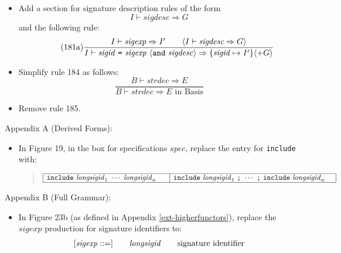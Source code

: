 \documentclass[twoside,titlepage]{article}
\begin{document}
\begin{appendix}
\begin{itemize}
\item Add a section for signature description rules of the form
  $$
  \boxed{I \vdash \mathit{sigdesc} \Rightarrow G}
  $$
  and the following rule:
  \begin{equation}
  \tag{181a}
  \frac{
  I \vdash \mathit{sigexp} \Rightarrow I'
  \qquad
  \langle I \vdash \mathit{sigdesc} \Rightarrow G\rangle
  }{
  I \vdash \mathit{sigid}~\mbox{\tt=}~\mathit{sigexp}~\langle{\tt{and}}~\mathit{sigdesc}\rangle \Rightarrow \{\mathit{sigid}\mapsto I'\}\langle+ G\rangle
  }
  \end{equation}

\item Simplify rule 184 as follows:
  \begin{equation}
  \tag{184}
  \frac{
  B \vdash \mathit{strdec} \Rightarrow E
  }{
  B \vdash \mathit{strdec} \Rightarrow \mbox{$E$ in Basis}
  }
  \end{equation}

\item Remove rule 185.
\end{itemize}

Appendix A (Derived Forms):
\begin{itemize}
\item In Figure 19, in the box for specifications $\mathit{spec}$, replace the entry for {\tt include} with:
  \begin{quote}
  $\begin{array}{|l|l|}
  \hline
  {\tt{include}}~\mathit{longsigid}_1~\cdots~\mathit{longsigid}_n~~~~
  & {\tt{include}}~\mathit{longsigid}_1~\mbox{\tt;}~\cdots~\mbox{\tt;}~{\tt{include}}~\mathit{longsigid}_n~~~ \\
  \hline
  \end{array}$ \\
  \end{quote}
\end{itemize}

Appendix B (Full Grammar):
\begin{itemize}
\item In Figure 23b (as defined in Appendix \ref{ext-higherfunctors}), replace the $\mathit{sigexp}$ production for signature identifiers to:
  $$
  \begin{array}{l@{\qquad}l@{\qquad}l}
  [\mathit{sigexp} ::=] & \mathit{longsigid} & \textrm{signature identifier} \\
  \end{array}
  $$


\end{itemize}
\end{appendix}
\end{document}
